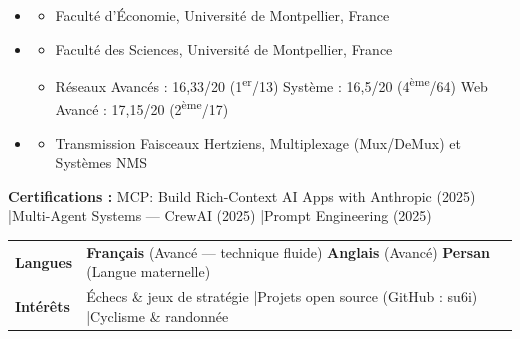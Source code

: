 \documentclass[11pt,a4paper]{article}
\renewcommand{\itemspace}{\vspace{0.2em}}
\begin{document}
\begin{itemize}[leftmargin=1em, label={}]
    \item
    \begin{itemize}[leftmargin=1.5em, label={$\circ$}, nosep]
        \item Faculté d'Économie, Université de Montpellier, France
    \end{itemize}

    \itemspace
    \item
    \begin{itemize}[leftmargin=1.5em, label={$\circ$}, nosep]
        \item Faculté des Sciences, Université de Montpellier, France
        \item Réseaux Avancés : 16,33/20 (1\textsuperscript{er}/13) \quad Système : 16,5/20 (4\textsuperscript{ème}/64) \quad Web Avancé : 17,15/20 (2\textsuperscript{ème}/17)
    \end{itemize}

    \itemspace
    \item
    \begin{itemize}[leftmargin=1.5em, label={$\circ$}, nosep]
        \item Transmission Faisceaux Hertziens, Multiplexage (Mux/DeMux) et Systèmes NMS
    \end{itemize}
\end{itemize}

\noindent\textbf{Certifications :} MCP: Build Rich-Context AI Apps with Anthropic (2025) \quad|\quad Multi-Agent Systems — CrewAI (2025) \quad|\quad Prompt Engineering (2025)

\noindent
\begin{tabularx}{\linewidth}{@{} p{3.5cm} X @{}}
\textbf{Langues} & \textbf{Français} (Avancé — technique fluide) \quad \textbf{Anglais} (Avancé) \quad \textbf{Persan} (Langue maternelle) \\
\textbf{Intérêts} & Échecs \& jeux de stratégie \quad|\quad Projets open source (GitHub : su6i) \quad|\quad Cyclisme \& randonnée \\
\end{tabularx}
\end{document}

